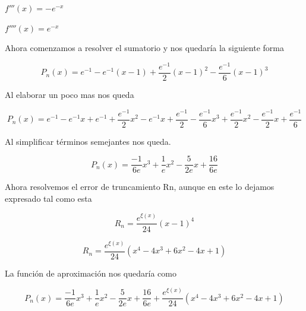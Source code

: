 \documentclass[12pt]{article}
\begin{document}
$f'''(x) = -e^{-x}$

$f''''(x) = e^{-x}$

Ahora comenzamos a resolver el sumatorio y nos quedaría la siguiente forma

$$P_n(x) = e^{-1}-e^{-1}(x-1)+ \frac{e^{-1}}{2}(x-1)^2-\frac{e^{-1}}{6}(x-1)^3$$

Al elaborar un poco mas nos queda

$$P_n(x) =  e^{-1} - e^{-1}x + e^{-1} + \frac{e^{-1}}{2}x^2-e^{-1}x+\frac{e^{-1}}{2}-\frac{e^{-1}}{6}x^3+\frac{e^{-1}}{2}x^2-\frac{e^{-1}}{2}x+\frac{e^{-1}}{6}$$

Al simplificar términos semejantes nos queda.

$$P_n(x) = \frac{-1}{6e}x^3+\frac{1}{e}x^2-\frac{5}{2e}x+\frac{16}{6e}$$

Ahora resolvemos el error de truncamiento Rn, aunque en este lo dejamos expresado tal como esta


$$R_n = \frac{e^{\xi(x)}}{24}(x-1)^4$$

$$R_n = \frac{e^{\xi(x)}}{24}(x^4-4x^3+6x^2-4x+1)$$

La función de aproximación nos quedaría como 

$$P_n(x) = \frac{-1}{6e}x^3+\frac{1}{e}x^2-\frac{5}{2e}x+\frac{16}{6e} + \frac{e^{\xi(x)}}{24}(x^4-4x^3+6x^2-4x+1)$$



\vspace{0.5cm}


\renewcommand{\refname}{\MakeUppercase{REFERENCIAS}}


\end{document}
